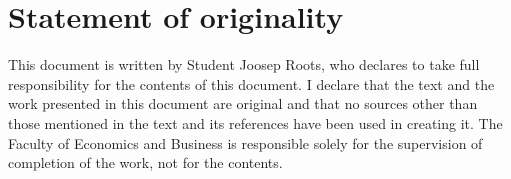 \chapter*{Statement of originality}

This document is written by Student Joosep Roots, who
declares to take full responsibility for the contents of this document.
I declare that the text and the work presented in this document are original and that no
sources other than those mentioned in the text and its references have been used in
creating it.
The Faculty of Economics and Business is responsible solely for the supervision of
completion of the work, not for the contents.